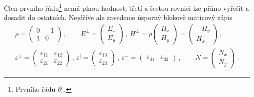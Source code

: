 Člen prvního řádu\footnote{Prvního řádu $\partial_z$.} nemá plnou hodnost; třetí a šestou rovnici lze přímo vyřešit a dosadit do ostatních.
Nejdříve ale zavedeme úsporný blokově maticový zápis
\begin{align}
\label{eqn:Berreman-blokove-znaceni}
    \rho = \begin{pmatrix}0 & -1 \\ 1 & 0\end{pmatrix}
    \,, \qquad E^\perp = \begin{pmatrix}E_x \\ E_y\end{pmatrix}
    \,, \, H^\perp = \rho \begin{pmatrix} H_x \\ H_y\end{pmatrix} = \begin{pmatrix} -H_y \\ H_x \end{pmatrix}
    \,, \\ \varepsilon^\perp=\begin{pmatrix}\varepsilon_{11} & \varepsilon_{12} \\ \varepsilon_{21} & \varepsilon_{22}\end{pmatrix}
    \,, \, \varepsilon^\vert=\begin{pmatrix} \varepsilon_{13} \\ \varepsilon_{23} \end{pmatrix}
    \,, \, \varepsilon^-=\begin{pmatrix} \varepsilon_{31} & \varepsilon_{32} \end{pmatrix}
    \,, \qquad N = \begin{pmatrix} N_x \\ N_y \end{pmatrix}
    \,.
\end{align}

